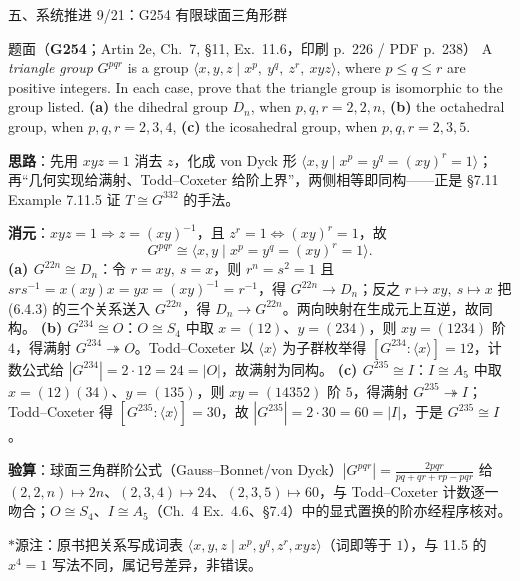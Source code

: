 \documentclass[aspectratio=169,10pt,fontset=none]{ctexbeamer}
\newcommand{\ex}[1]{\textcolor{accent}{\footnotesize\bfseries #1}}
\newcommand{\key}[1]{\textcolor{ink}{\bfseries #1}}
\newcommand{\starpt}{\textcolor{accent}{\bfseries$\ast$}}
\begin{document}
\begin{frame}[t]{五、系统推进 9/21：G254 有限球面三角形群}
\label{ex:G254}
\scriptsize
\begin{block}{\footnotesize 题面（\ex{G254}；Artin 2e, Ch.~7, §11, Ex.~11.6，印刷 p.~226 / PDF p.~238）}
A \emph{triangle group} $G^{pqr}$ is a group $\langle x,y,z\mid x^p,\ y^q,\ z^r,\ xyz\rangle$, where $p\le q\le r$ are positive integers. In each case, prove that the triangle group is isomorphic to the group listed. \textbf{(a)} the dihedral group $D_n$, when $p,q,r=2,2,n$, \textbf{(b)} the octahedral group, when $p,q,r=2,3,4$, \textbf{(c)} the icosahedral group, when $p,q,r=2,3,5$.
\end{block}
\key{思路}：先用 $xyz=1$ 消去 $z$，化成 von Dyck 形 $\langle x,y\mid x^p=y^q=(xy)^r=1\rangle$；再“几何实现给满射、Todd--Coxeter 给阶上界”，两侧相等即同构——正是 §7.11 Example 7.11.5 证 $T\cong G^{332}$ 的手法。

\key{消元}：$xyz=1\Rightarrow z=(xy)^{-1}$，且 $z^r=1\iff (xy)^r=1$，故
\[
G^{pqr}\cong\langle x,y\mid x^p=y^q=(xy)^r=1\rangle .
\]
\key{(a) $G^{22n}\cong D_n$}：令 $r=xy,\ s=x$，则 $r^n=s^2=1$ 且 $srs^{-1}=x(xy)x=yx=(xy)^{-1}=r^{-1}$，得 $G^{22n}\to D_n$；反之 $r\mapsto xy,\ s\mapsto x$ 把 (6.4.3) 的三个关系送入 $G^{22n}$，得 $D_n\to G^{22n}$。两向映射在生成元上互逆，故同构。
\key{(b) $G^{234}\cong O$}：$O\cong S_4$ 中取 $x=(12)$、$y=(234)$，则 $xy=(1234)$ 阶 $4$，得满射 $G^{234}\twoheadrightarrow O$。Todd--Coxeter 以 $\langle x\rangle$ 为子群枚举得 $[G^{234}:\langle x\rangle]=12$，计数公式给 $|G^{234}|=2\cdot12=24=|O|$，故满射为同构。
\key{(c) $G^{235}\cong I$}：$I\cong A_5$ 中取 $x=(12)(34)$、$y=(135)$，则 $xy=(14352)$ 阶 $5$，得满射 $G^{235}\twoheadrightarrow I$；Todd--Coxeter 得 $[G^{235}:\langle x\rangle]=30$，故 $|G^{235}|=2\cdot30=60=|I|$，于是 $G^{235}\cong I$。

\key{验算}：球面三角群阶公式（Gauss--Bonnet/von Dyck）$|G^{pqr}|=\frac{2pqr}{pq+qr+rp-pqr}$ 给 $(2,2,n)\mapsto 2n$、$(2,3,4)\mapsto 24$、$(2,3,5)\mapsto 60$，与 Todd--Coxeter 计数逐一吻合；$O\cong S_4$、$I\cong A_5$（Ch.~4 Ex.~4.6、§7.4）中的显式置换的阶亦经程序核对。

\starpt 源注：原书把关系写成词表 $\langle x,y,z\mid x^p,y^q,z^r,xyz\rangle$（词即等于 $1$），与 11.5 的 $x^4=1$ 写法不同，属记号差异，非错误。
\end{frame}
\end{document}
